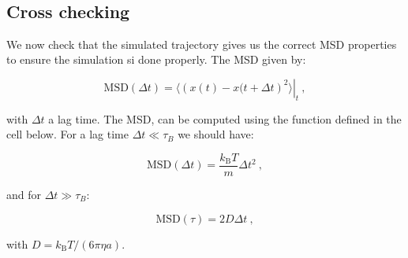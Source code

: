 \documentclass[11pt]{article}
\begin{document}
    \begin{center}
    \end{center}
    { \hspace*{\fill} \\}
    
    \hypertarget{cross-checking}{%
\subsection{Cross checking}\label{cross-checking}}

We now check that the simulated trajectory gives us the correct MSD
properties to ensure the simulation si done properly. The MSD given by:

\begin{equation}
\mathrm{MSD}(\Delta t) = \left. \langle \left( x(t) - x(t+\Delta t \right)^2 \rangle \right|_t ~,
\end{equation}

with \(\Delta t\) a lag time. The MSD, can be computed using the
function defined in the cell below. For a lag time
\(\Delta t \ll \tau_B\) we should have:

\begin{equation}
\mathrm{MSD}(\Delta t) = \frac{k_\mathrm{B}T}{m} \Delta t ^2 ~,
\end{equation}

and for \(\Delta t \gg \tau_B\):

\begin{equation}
\mathrm{MSD}(\tau) = 2 D \Delta t~,
\end{equation}

with \(D = k_\mathrm{B}T / (6 \pi \eta a)\).
\end{document}

